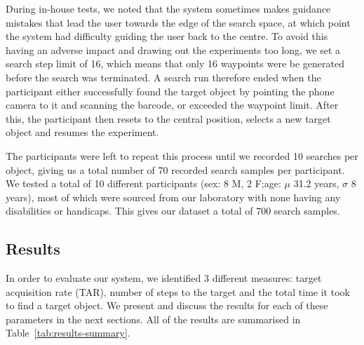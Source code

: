 \documentclass[a4paper, twoside]{article}
\begin{document}
During in-house tests, we noted that the system sometimes makes guidance mistakes that lead the user towards the edge of the search space, at which point the system had difficulty guiding the user back to the centre. To avoid this having an adverse impact and drawing out the experiments too long, we set a search step limit of 16, which means that only 16 waypoints were be generated before the search was terminated. A search run therefore ended when the participant either successfully found the target object by pointing the phone camera to it and scanning the barcode, or exceeded the waypoint limit. After this, the participant then resets to the central position, selects a new target object and resumes the experiment.

The participants were left to repeat this process until we recorded 10 searches per object, giving us a total number of 70 recorded search samples per participant. We tested a total of 10 different participants (sex: 8 M, 2 F;\@ age: $\mu$ 31.2 years, $\sigma$ 8 years), most of which were sourced from our laboratory with none having any disabilities or handicaps. This gives our dataset a total of 700 search samples.

\subsection{Results}

\noindent In order to evaluate our system, we identified 3 different measures: target acquisition rate (TAR), number of steps to the target and the total time it took to find a target object. We present and discuss the results for each of these parameters in the next sections. All of the results are summarised in Table~\ref{tab:results-summary}.
\end{document}
